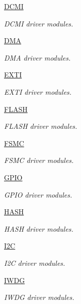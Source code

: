 \begin{DoxyCompactItemize}
\hyperlink{group___d_c_m_i}{D\-C\-M\-I}
\begin{DoxyCompactList}\small\item\em D\-C\-M\-I driver modules. \end{DoxyCompactList}\item 
\hyperlink{group___d_m_a}{D\-M\-A}
\begin{DoxyCompactList}\small\item\em D\-M\-A driver modules. \end{DoxyCompactList}\item 
\hyperlink{group___e_x_t_i}{E\-X\-T\-I}
\begin{DoxyCompactList}\small\item\em E\-X\-T\-I driver modules. \end{DoxyCompactList}\item 
\hyperlink{group___f_l_a_s_h}{F\-L\-A\-S\-H}
\begin{DoxyCompactList}\small\item\em F\-L\-A\-S\-H driver modules. \end{DoxyCompactList}\item 
\hyperlink{group___f_s_m_c}{F\-S\-M\-C}
\begin{DoxyCompactList}\small\item\em F\-S\-M\-C driver modules. \end{DoxyCompactList}\item 
\hyperlink{group___g_p_i_o}{G\-P\-I\-O}
\begin{DoxyCompactList}\small\item\em G\-P\-I\-O driver modules. \end{DoxyCompactList}\item 
\hyperlink{group___h_a_s_h}{H\-A\-S\-H}
\begin{DoxyCompactList}\small\item\em H\-A\-S\-H driver modules. \end{DoxyCompactList}\item 
\hyperlink{group___i2_c}{I2\-C}
\begin{DoxyCompactList}\small\item\em I2\-C driver modules. \end{DoxyCompactList}\item 
\hyperlink{group___i_w_d_g}{I\-W\-D\-G}
\begin{DoxyCompactList}\small\item\em I\-W\-D\-G driver modules. \end{DoxyCompactList}\item 

\end{DoxyCompactItemize}
